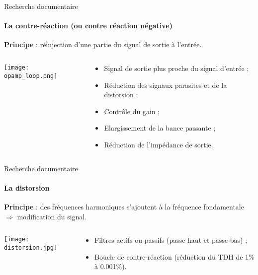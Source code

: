 \documentclass[pdf]{beamer}
\begin{document}
\begin{frame}{Recherche documentaire}
	\framesubtitle{La contre-réaction (ou contre réaction négative)}
	
	\textbf{Principe} : réinjection d'une partie du signal de sortie à l'entrée.
	
	\begin{columns}
		\begin{column}{5cm}
			\texttt{[image: opamp\_loop.png]}
		\end{column}
		
		\begin{column}{5cm}
				\begin{itemize}
					\item Signal de sortie plus proche du signal d'entrée ;
					\item	Réduction des signaux parasites et de la distorsion ;
					\item Contrôle du gain ;
					\item Elargissement de la bance passante ;
					\item Réduction de l'impédance de sortie.
				\end{itemize}
		\end{column}
	\end{columns}
\end{frame}

\begin{frame}{Recherche documentaire}
	\framesubtitle{La distorsion}
	
	\textbf{Principe} : des fréquences harmoniques s'ajoutent à la fréquence fondamentale
	$\Rightarrow$ modification du signal.
	
	\bigbreak
	
	\begin{columns}
		\begin{column}{5cm}
			\texttt{[image: distorsion.jpg]}
		\end{column}
		
		\begin{column}{5cm}
			\begin{itemize}
				\item	Filtres actifs ou passifs (passe-haut et passe-bas) ;
				\item Boucle de contre-réaction (réduction du TDH de 1\% à 0.001\%).
			\end{itemize}
		\end{column}
	\end{columns}
\end{frame}
\end{document}
